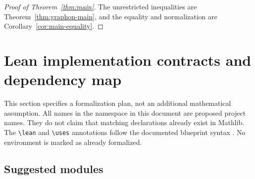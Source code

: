 \begin{proof}[Proof of Theorem~\ref{thm:main}]
The unrestricted inequalities are Theorem~\ref{thm:graphon-main}, and the equality and
normalization are Corollary~\ref{cor:main-equality}.
\end{proof}

\section{Lean implementation contracts and dependency map}
\label{sec:lean-plan}

This section specifies a formalization plan, not an additional mathematical assumption.
All names in the  namespace in this document are proposed project
names.  They do not claim that matching declarations already exist in Mathlib.
The \verb|\lean| and \verb|\uses| annotations follow the documented blueprint syntax
\cite{blueprintdoc}.  No environment is marked as already formalized.

\subsection{Suggested modules}


